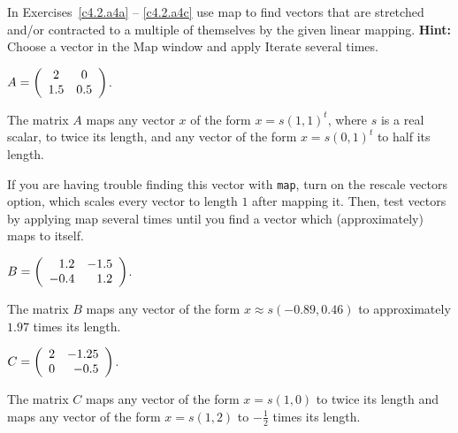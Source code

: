 \documentclass{ximera}
\begin{document}
\noindent In Exercises~\ref{c4.2.a4a} -- \ref{c4.2.a4c} use {\sf map} to
find vectors that are stretched and/or contracted to a multiple of
themselves by the given linear mapping.  {\bf Hint:}  Choose a vector in the
{\sf Map} window and apply {\sf Iterate} several times.
\begin{exercise} \label{c4.2.a4a}
$A=\left(\begin{array}{cc} 2 & 0\\ 1.5 &0.5\end{array}\right)$.

\begin{solution}
The matrix $A$ maps any vector $x$ of the form
$x = s(1,1)^t$, where $s$ is a real scalar, to twice its length, and any
vector of the form $x = s(0,1)^t$ to half its length.

\para If you are having trouble finding this vector with {\tt map},
turn on the rescale vectors option, which scales every vector to length
$1$ after mapping it.  Then, test vectors by applying {\sf map} several
times until you find a vector which (approximately) maps to itself.


\end{solution}
\end{exercise}
\begin{exercise} \label{c4.2.a4b}
$B=\left(\begin{array}{rr} 1.2 & -1.5\\ -0.4 &1.2\end{array}\right)$.

\begin{solution}
The matrix $B$ maps any vector of the form
$x \approx s(-0.89,0.46)$ to approximately $1.97$ times its length.

\end{solution}
\end{exercise}
\begin{exercise} \label{c4.2.a4c}
$C=\left(\begin{array}{rr} 2 & -1.25\\ 0 &-0.5\end{array}\right)$.

\begin{solution}
The matrix $C$ maps any vector of the form $x = s(1,0)$
to twice its length and maps any vector of the form $x = s(1,2)$ to
$-\frac{1}{2}$ times its length.

\end{solution}
\end{exercise}
\end{document}
